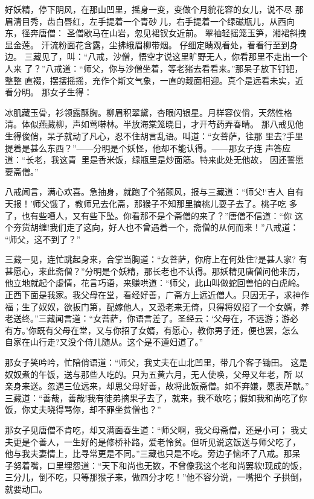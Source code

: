 好妖精，停下阴风，在那山凹里，摇身一变，变做个月貌花容的女儿，说不尽
那眉清目秀，齿白唇红，左手提着一个青砂儿，右手提着一个绿磁瓶儿，从西向
东，径奔唐僧：
圣僧歇马在山岩，忽见裙钗女近前。
翠袖轻摇笼玉笋，湘裙斜拽显金莲。
汗流粉面花含露，尘拂蛾眉柳带烟。
仔细定睛观看处，看看行至到身边。
三藏见了，叫：“八戒，沙僧，悟空才说这里旷野无人，你看那里不走出一个人来
了？”八戒道：“师父，你与沙僧坐着，等老猪去看看来。”那呆子放下钉钯，整整
直裰，摆摆摇摇，充作个斯文气象，一直的觌面相迎。真个是远看未实，近看分明。
那女子生得：

冰肌藏玉骨，衫领露酥胸。柳眉积翠黛，杏眼闪银星。月样容仪俏，天然性格
清。体似燕藏柳，声如莺啭林。半放海棠笼晓日，才开芍药弄春晴。
那八戒见他生得俊俏，呆子就动了凡心，忍不住胡言乱语。叫道：“女菩萨，往那
里去?手里提着是甚么东西？”——分明是个妖怪，他却不能认得。——那女子连
声答应道：“长老，我这青里是香米饭，绿瓶里是炒面筋。特来此处无他故，
因还誓愿要斋僧。”

八戒闻言，满心欢喜。急抽身，就跑了个猪颠风，报与三藏道：“师父!‘吉人
自有天报！’师父饿了，教师兄去化斋，那猴子不知那里摘桃儿耍子去了。桃子吃
多了，也有些嘈人，又有些下坠。你看那不是个斋僧的来了？”唐僧不信道：“你
这个夯货胡缠!我们走了这向，好人也不曾遇着一个，斋僧的从何而来！”八戒道：
“师父，这不到了？”

三藏一见，连忙跳起身来，合掌当胸道：“女菩萨，你府上在何处住?是甚人家?
有甚愿心，来此斋僧？”分明是个妖精，那长老也不认得。那妖精见唐僧问他来历，
他立地就起个虚情，花言巧语，来赚哄道：“师父，此山叫做蛇回兽怕的白虎岭。
正西下面是我家。我父母在堂，看经好善，广斋方上远近僧人。只因无子，求神作
福；生了奴奴，欲扳门第，配嫁他人，又恐老来无倚，只得将奴招了一个女婿，养
老送终。”三藏闻言道：“女菩萨，你语言差了。圣经云：‘父母在，不远游；游必
有方。’你既有父母在堂，又与你招了女婿，有愿心，教你男子还，便也罢，怎么
自家在山行走?又没个侍儿随从。这个是不遵妇道了。”

那女子笑吟吟，忙陪俏语道：“师父，我丈夫在山北凹里，带几个客子锄田。
这是奴奴煮的午饭，送与那些人吃的。只为五黄六月，无人使唤，父母又年老，所
以亲身来送。忽遇三位远来，却思父母好善，故将此饭斋僧。如不弃嫌，愿表芹献。”
三藏道：“善哉，善哉!我有徒弟摘果子去了，就来，我不敢吃；假如我和尚吃了你
饭，你丈夫晓得骂你，却不罪坐贫僧也？”

那女子见唐僧不肯吃，却又满面春生道：“师父啊，我父母斋僧，还是小可；
我丈夫更是个善人，一生好的是修桥补路，爱老怜贫。但听见说这饭送与师父吃了，
他与我夫妻情上，比寻常更是不同。”三藏也只是不吃。旁边子恼坏了八戒。那呆
子努着嘴，口里埋怨道：“天下和尚也无数，不曾像我这个老和尚罢软!现成的饭，
三分儿，倒不吃，只等那猴子来，做四分才吃！”他不容分说，一嘴把个子拱倒，
就要动口。

